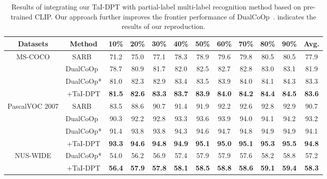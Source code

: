 \documentclass[10pt,twocolumn,letterpaper]{article}
\begin{document}
\begin{table*} [!ht]
  \centering
  \caption{Results of integrating our TaI-DPT with partial-label multi-label recognition method based on pre-trained CLIP. Our approach further improves the frontier performance of DualCoOp~\cite{dualcoop}.  indicates the results of our reproduction.}
  \vspace{-2mm}
  \setlength{\tabcolsep}{2.3mm}
  \begin{tabular}{c|c|ccccccccc|c}
    \toprule
    Datasets & Method & 10\% &20\% & 30\% & 40\% & 50\% & 60\% & 70\% & 80\% & 90\% & Avg. \\
    \midrule
\multirow{4}{*}{MS-COCO} & SARB~\cite{pu2022semantic} & 71.2 & 75.0 & 77.1 & 78.3 & 78.9 & 79.6 & 79.8 & 80.5 & 80.5 & 77.9\\
    & DualCoOp~\cite{dualcoop} & 78.7 & 80.9 & 81.7 & 82.0 & 82.5 & 82.7 & 82.8 & 83.0 & 83.1 & 81.9\\  
& DualCoOp* & 81.0 & 82.3 & 82.9 & 83.4 & 83.5 & 83.9 & 84.0 & 84.1 & 84.3 & 83.3\\
    & +TaI-DPT & \textbf{81.5} & \textbf{82.6} & \textbf{83.3} & \textbf{83.7} & \textbf{83.9} & \textbf{84.0} & \textbf{84.2} & \textbf{84.4} & \textbf{84.5} & \textbf{83.6}\\ 
    
\hline
    \multirow{4}{*}{PascalVOC 2007} & SARB~\cite{pu2022semantic} & 83.5 & 88.6 & 90.7 & 91.4 & 91.9 & 92.2 & 92.6 & 92.8 & 92.9 & 90.7 \\
    & DualCoOp~\cite{dualcoop} & 90.3 & 92.2 & 92.8 & 93.3 & 93.6 & 93.9 & 94.0 & 94.1 & 94.2 & 93.2\\  
& DualCoOp* & 91.4 & 93.8 & 93.8 & 94.3 & 94.6 & 94.7 & 94.8 & 94.9 & 94.9 & 94.1\\  
    & +TaI-DPT & \textbf{93.3} & \textbf{94.6} & \textbf{94.8} & \textbf{94.9} & \textbf{95.1} & \textbf{95.0} & \textbf{95.1} & \textbf{95.3} & \textbf{95.5} & \textbf{94.8}\\
    
    \hline
    \multirow{2}{*}{NUS-WIDE} & DualCoOp* & 54.0 & 56.2 & 56.9 & 57.4 & 57.9 & 57.9 & 57.6 & 58.2 & 58.8 & 57.2\\  
    & +TaI-DPT & \textbf{56.4} & \textbf{57.9} & \textbf{57.8} & \textbf{58.1} & \textbf{58.5} & \textbf{58.8} & \textbf{58.6} & \textbf{59.1} & \textbf{59.4} & \textbf{58.3}\\

    \bottomrule
  \end{tabular}\vspace{-3mm}
  \label{tab:partial}
\end{table*}
\end{document}
